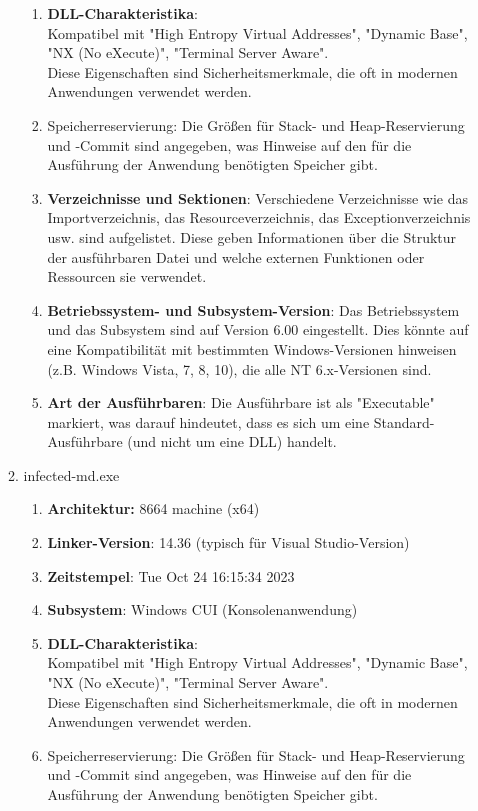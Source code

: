 \documentclass{article}
\begin{document}
\begin{enumerate}
\begin{enumerate}
\begin{enumerate}
				\item \textbf{DLL-Charakteristika}:\\
				Kompatibel mit "High Entropy Virtual Addresses", "Dynamic Base", "NX (No eXecute)", "Terminal Server Aware".\\
				Diese Eigenschaften sind Sicherheitsmerkmale, die oft in modernen Anwendungen verwendet werden.
				\item Speicherreservierung: Die Größen für Stack- und Heap-Reservierung und -Commit sind angegeben, was Hinweise auf den für die Ausführung der Anwendung benötigten Speicher gibt.
				\item \textbf{Verzeichnisse und Sektionen}: Verschiedene Verzeichnisse wie das Importverzeichnis, das Resourceverzeichnis, das Exceptionverzeichnis usw. sind aufgelistet. Diese geben Informationen über die Struktur der ausführbaren Datei und welche externen Funktionen oder Ressourcen sie verwendet.
				\item \textbf{Betriebssystem- und Subsystem-Version}: Das Betriebssystem und das Subsystem sind auf Version 6.00 eingestellt. Dies könnte auf eine Kompatibilität mit bestimmten Windows-Versionen hinweisen (z.B. Windows Vista, 7, 8, 10), die alle NT 6.x-Versionen sind.
				\item \textbf{Art der Ausführbaren}: Die Ausführbare ist als "Executable" markiert, was darauf hindeutet, dass es sich um eine Standard-Ausführbare (und nicht um eine DLL) handelt.
			\end{enumerate}
			\item infected-md.exe
			\begin{enumerate}
				\item \textbf{Architektur:} 8664 machine (x64)
				\item \textbf{Linker-Version}: 14.36 (typisch für Visual Studio-Version)
				\item \textbf{Zeitstempel}: Tue Oct 24 16:15:34 2023
				\item \textbf{Subsystem}: Windows CUI (Konsolenanwendung)
				\item \textbf{DLL-Charakteristika}:\\
				Kompatibel mit "High Entropy Virtual Addresses", "Dynamic Base", "NX (No eXecute)", "Terminal Server Aware".\\
				Diese Eigenschaften sind Sicherheitsmerkmale, die oft in modernen Anwendungen verwendet werden.
				\item Speicherreservierung: Die Größen für Stack- und Heap-Reservierung und -Commit sind angegeben, was Hinweise auf den für die Ausführung der Anwendung benötigten Speicher gibt.

\end{enumerate}
\end{enumerate}
\end{enumerate}
\end{document}
